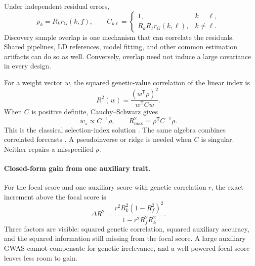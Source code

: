 \documentclass[11pt,a4paper]{article}
\begin{document}
Under independent residual errors,
\begin{equation}
  \rho_k=R_k r_G(k,f),
  \qquad
  C_{k\ell}=
  \begin{cases}
    1, & k=\ell,\\
    R_kR_\ell r_G(k,\ell), & k\ne\ell .
  \end{cases}
  \label{eq:rho-c}
\end{equation}
Discovery sample overlap is one mechanism that can correlate the
residuals. Shared pipelines, LD references, model fitting, and
other common estimation artifacts can do so as well. Conversely,
overlap need not induce a large covariance in every design.

For a weight vector \(w\), the squared genetic-value correlation
of the linear index is
\begin{equation}
  R^2(w)=\frac{(w^{\mathsf T}\rho)^2}{w^{\mathsf T}Cw}.
  \label{eq:index-r2}
\end{equation}
When \(C\) is positive definite, Cauchy--Schwarz gives
\begin{equation}
  w_\star \propto C^{-1}\rho,
  \qquad
  R^2_{\max}=\rho^{\mathsf T}C^{-1}\rho .
  \label{eq:index-optimum}
\end{equation}
This is the classical selection-index solution
\cite{smith1936,hazel1943}. The same algebra combines correlated
forecasts \cite{bates1969}. A pseudoinverse or ridge is needed
when \(C\) is singular. Neither repairs a misspecified \(\rho\).

\paragraph{Closed-form gain from one auxiliary trait.}
For the focal score and one auxiliary score with genetic
correlation \(r\), the exact increment above the focal score is
\begin{equation}
  \Delta R^2=
  \frac{r^2R_k^2(1-R_f^2)^2}
       {1-r^2R_f^2R_k^2}.
  \label{eq:two-score-gain}
\end{equation}
Three factors are visible: squared genetic correlation, squared
auxiliary accuracy, and the squared information still missing
from the focal score. A large auxiliary GWAS cannot compensate
for genetic irrelevance, and a well-powered focal score leaves
less room to gain.
\end{document}

